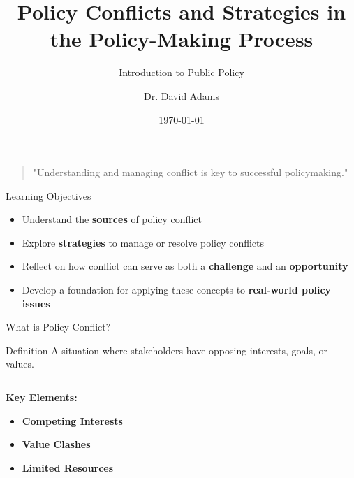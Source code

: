 \documentclass[10pt]{beamer}
\title{Policy Conflicts and Strategies in the Policy-Making Process}
\subtitle{Introduction to Public Policy}
\author{Dr. David Adams}
\institute{POSC 315 – Week 13}
\date{\today}
\begin{document}
\begin{frame}
    \titlepage
    \begin{quote}
        \small "Understanding and managing conflict is key to successful policymaking."
    \end{quote}
\end{frame}

\begin{frame}{Learning Objectives}
    \begin{itemize}[<+->]
        \item Understand the \textbf{sources} of policy conflict
        \item Explore \textbf{strategies} to manage or resolve policy conflicts
        \item Reflect on how conflict can serve as both a \textbf{challenge} and an \textbf{opportunity}
        \item Develop a foundation for applying these concepts to \textbf{real-world policy issues}
    \end{itemize}
\end{frame}

\begin{frame}{What is Policy Conflict?}
    \begin{block}{Definition}
        A situation where stakeholders have opposing interests, goals, or values.
    \end{block}
    
    \begin{columns}[T]
        \begin{column}{0.5\textwidth}
            \textbf{Key Elements:}
            \begin{itemize}
                \item \textbf{Competing Interests}
                \item \textbf{Value Clashes}
                \item \textbf{Limited Resources}
            \end{itemize}
        \end{column}
        \begin{column}{0.5\textwidth}
        \end{column}
    \end{columns}
\end{frame}
\end{document}
